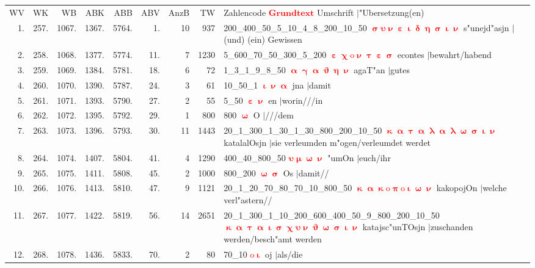 \documentclass[a4paper,10pt,landscape]{article}
\begin{document}
\begin{tabular}{rrrrrrrrp{120mm}}
WV&WK&WB&ABK&ABB&ABV&AnzB&TW&Zahlencode \textcolor{red}{$\boldsymbol{Grundtext}$} Umschrift $|$"Ubersetzung(en)\\
1.&257.&1067.&1367.&5764.&1.&10&937&200\_400\_50\_5\_10\_4\_8\_200\_10\_50 \textcolor{red}{$\boldsymbol{\upsigma\upsilon\upnu\upepsilon\upiota\updelta\upeta\upsigma\upiota\upnu}$} s"unejd"asjn $|$(und) (ein) Gewissen\\
2.&258.&1068.&1377.&5774.&11.&7&1230&5\_600\_70\_50\_300\_5\_200 \textcolor{red}{$\boldsymbol{\upepsilon\upchi\mathrm{o}\upnu\uptau\upepsilon\upsigma}$} econtes $|$bewahrt/habend\\
3.&259.&1069.&1384.&5781.&18.&6&72&1\_3\_1\_9\_8\_50 \textcolor{red}{$\boldsymbol{\upalpha\upgamma\upalpha\upvartheta\upeta\upnu}$} agaT"an $|$gutes\\
4.&260.&1070.&1390.&5787.&24.&3&61&10\_50\_1 \textcolor{red}{$\boldsymbol{\upiota\upnu\upalpha}$} jna $|$damit\\
5.&261.&1071.&1393.&5790.&27.&2&55&5\_50 \textcolor{red}{$\boldsymbol{\upepsilon\upnu}$} en $|$worin///in\\
6.&262.&1072.&1395.&5792.&29.&1&800&800 \textcolor{red}{$\boldsymbol{\upomega}$} O $|$///dem\\
7.&263.&1073.&1396.&5793.&30.&11&1443&20\_1\_300\_1\_30\_1\_30\_800\_200\_10\_50 \textcolor{red}{$\boldsymbol{\upkappa\upalpha\uptau\upalpha\uplambda\upalpha\uplambda\upomega\upsigma\upiota\upnu}$} katalalOsjn $|$sie verleumden m"ogen/verleumdet werdet\\
8.&264.&1074.&1407.&5804.&41.&4&1290&400\_40\_800\_50 \textcolor{red}{$\boldsymbol{\upsilon\upmu\upomega\upnu}$} "umOn $|$euch/ihr\\
9.&265.&1075.&1411.&5808.&45.&2&1000&800\_200 \textcolor{red}{$\boldsymbol{\upomega\upsigma}$} Os $|$damit//\\
10.&266.&1076.&1413.&5810.&47.&9&1121&20\_1\_20\_70\_80\_70\_10\_800\_50 \textcolor{red}{$\boldsymbol{\upkappa\upalpha\upkappa\mathrm{o}\uppi\mathrm{o}\upiota\upomega\upnu}$} kakopojOn $|$welche verl"astern//\\
11.&267.&1077.&1422.&5819.&56.&14&2651&20\_1\_300\_1\_10\_200\_600\_400\_50\_9\_800\_200\_10\_50 \textcolor{red}{$\boldsymbol{\upkappa\upalpha\uptau\upalpha\upiota\upsigma\upchi\upsilon\upnu\upvartheta\upomega\upsigma\upiota\upnu}$} katajsc"unTOsjn $|$zuschanden werden/besch"amt werden\\
12.&268.&1078.&1436.&5833.&70.&2&80&70\_10 \textcolor{red}{$\boldsymbol{\mathrm{o}\upiota}$} oj $|$als/die\\

\end{tabular}
\end{document}
